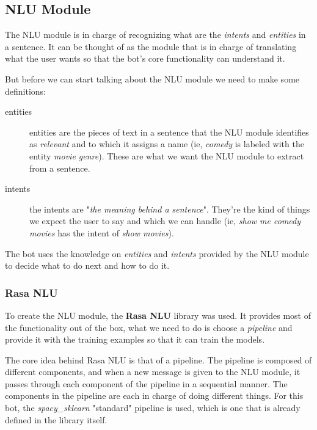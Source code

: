 \documentclass[11pt,a4paper]{article}
\begin{document}
	\subsection{NLU Module}
	\label{ssec-nlu-module}
	
		The NLU module is in charge of recognizing what are the \textit{intents} and \textit{entities} in a sentence. It can be thought of as the module that is in charge of translating what the user wants so that the bot's core functionality can understand it. 
		
		But before we can start talking about the NLU module we need to make some definitions:
		
		\begin{description}
			\item[entities] 
			entities are the pieces of text in a sentence that the NLU module identifies as \textit{relevant} and to which it assigns a name (ie, \textit{comedy} is labeled with the entity \textit{movie genre}). These are what we want the NLU module to extract from a sentence.
			
			\item[intents] 
			the intents are "\textit{the meaning behind a sentence}". They're the kind of things we expect the user to say and which we can handle (ie, \textit{show me comedy movies} has the intent of \textit{show movies}). 
		\end{description}
	
		The bot uses the knowledge on \textit{entities} and \textit{intents} provided by the NLU module to decide what to do next and how to do it.
		
		\subsubsection{Rasa NLU}
		\label{ssec-rasa-nlu}
			
			To create the NLU module, the \textbf{Rasa NLU} \cite{rasanlu} library was used. It provides most of the functionality out of the box, what we need to do is choose a \textit{pipeline} and provide it with the training examples so that it can train the models.
			
			The core idea behind Rasa NLU is that of a pipeline. The pipeline is composed of different components, and when a new message is given to the NLU module, it passes through each component of the pipeline in a sequential manner. The components in the pipeline are each in charge of doing different things. For this bot, the \textit{spacy\_sklearn} "standard" pipeline is  used, which is one that is already defined in the library itself. 
			
\end{document}
